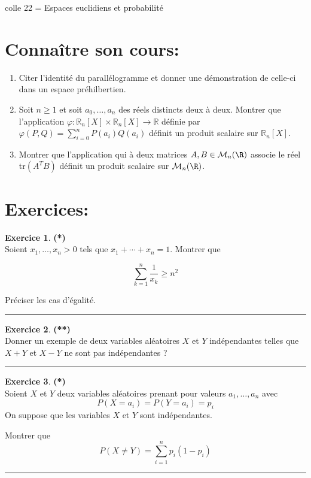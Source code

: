 \documentclass[a4paper,11pt]{article}
\theoremstyle{definition}
\newtheorem{exo}{Exercice} %
\begin{document}
	
	
	\begin{center}
		\Large \sc colle 22 = Espaces euclidiens et probabilité
	\end{center}
\raggedright


\section*{Connaître son cours:}
\begin{enumerate}
\item Citer l'identité du parallélogramme et donner une démonstration de celle-ci dans un espace préhilbertien. 
\item Soit $n\geq 1$ et soit $a_0,\dots,a_n$ des réels distincts deux à deux. Montrer que l'application $\varphi:\mathbb R_n[X]\times\mathbb R_n[X]\to\mathbb R$
définie par $\displaystyle \varphi(P,Q)=\sum_{i=0}^n P(a_i)Q(a_i)$ définit un produit scalaire sur $\mathbb R_n[X]$.
\item Montrer que l’application qui à deux matrices $A,B \in \mathcal{M}_n (\R)$ associe le réel tr$(A^T B )$ définit un produit scalaire sur $\mathcal{M}_n (\R)$.
\end{enumerate}

\section*{Exercices:} 	

	
\begin{exo}\textbf{(*)}\quad\\[0.25cm]
	Soient $x_{1}, \ldots, x_{n}>0$ tels que $x_{1}+\cdots+x_{n}=1$. Montrer que
	
	$$
	\sum_{k=1}^{n} \frac{1}{x_{k}} \geq n^{2}
	$$
	
	Préciser les cas d'égalité.
	
	
	\centering
	\rule{1\linewidth}{0.6pt}
\end{exo}

\begin{exo}\textbf{(**)}\quad\\[0.25cm]
	Donner un exemple de deux variables aléatoires $X$ et $Y$ indépendantes telles que
	 $X + Y$ et $X - Y$ ne sont pas indépendantes ?
		
	\centering
	\rule{1\linewidth}{0.6pt}
\end{exo}


	


\begin{exo}\textbf{(*)}\quad\\[0.25cm]%
	\noindent Soient $X$ et $Y$ deux variables aléatoires prenant pour valeurs $a_1 ,\dots  , a_n $ avec
	$$P(X = a_i ) = P(Y = a_i ) = p_i $$
	\noindent On suppose que les variables $X$ et $Y$ sont indépendantes.
	
	\noindent Montrer que
	$$P(X \neq Y ) = \sum_{i=1}^{n}p_i(1-p_i)$$

	\centering
\rule{1\linewidth}{0.6pt}
\end{exo}
\end{document}
